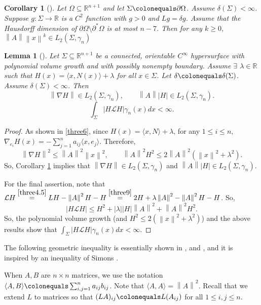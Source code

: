 \documentclass[12pt,reqno]{amsart}
\newtheorem{lemma}[theorem]{Lemma}
\newtheorem{cor}[theorem]{Corollary}
\theoremstyle{definition}
\renewcommand{\subset}{\subseteq}
\newcommand{\abs}[1]{\left|#1\right|}                   %
\newcommand{\vnormt}[1]{\left\|#1\right\|}    %
\newcommand{\R}{\mathbb{R}}
\newcommand{\redA}{\partial^{*}\Omega}
\newcommand{\sdimn}{n}
\newcommand{\adimn}{n+1}
\newcommand{\scon}{\lambda}
\newcommand{\pcon}{\delta}
\begin{document}
\begin{cor}[{\cite[Lemma 6.2]{zhu16}}]\label{cor5}
Let $\Omega\subset\R^{\adimn}$ and let $\Sigma\colonequals\partial\Omega$.  Assume $\pcon(\Sigma)<\infty$.  Suppose $g\colon\Sigma\to\R$ is a $C^{2}$ function with $g>0$ and $Lg=\pcon g$.  Assume that the Hausdorff dimension of $\partial\Omega\setminus\redA$ is at most $\sdimn-7$.  Then for any $k\geq0$, $\vnormt{A}\vnormt{x}^{k}\in L_{2}(\Sigma,\gamma_{\sdimn})$
\end{cor}

\begin{lemma}[{\cite[Theorem 9.36]{colding12a}}]\label{lemma39.1}
Let $\Sigma\subset\R^{\adimn}$ be a connected, orientable $C^{\infty}$ hypersurface with polynomial volume growth and with possibly nonempty boundary.  Assume $\exists$ $\scon\in\R$ such that $H(x)=\langle x,N(x)\rangle+\scon$ for all $x\in\Sigma$.  Let $\pcon\colonequals\pcon(\Sigma)$.   Assume $\pcon(\Sigma)<\infty$.  Then
$$\vnormt{\nabla H}\in L_{2}(\Sigma,\gamma_{\sdimn}),\qquad\vnormt{A}\abs{H}\in L_{2}(\Sigma,\gamma_{\sdimn}).$$
$$\int_{\Sigma}\abs{H\mathcal{L}H}\gamma_{\sdimn}(x)dx<\infty.$$
\end{lemma}
\begin{proof}
As shown in \eqref{three6}, since $H(x)=\langle x,N\rangle+\scon$, for any $1\leq i\leq\sdimn$, $\nabla_{e_{i}}H(x)=-\sum_{j=1}^{\sdimn}a_{ij}\langle x,e_{j}\rangle$.  Therefore,
$$\vnormt{\nabla H}^{2}\leq\vnormt{A}^{2}\vnormt{x}^{2},\qquad \vnormt{A}^{2}H^{2}\leq2\vnormt{A}^{2}(\vnormt{x}^{2}+\scon^{2}).$$
So, Corollary \ref{cor5} implies that $\vnormt{\nabla H}\in L_{2}(\Sigma,\gamma_{\sdimn})$ and $\vnormt{A}\abs{H}\in L_{2}(\Sigma,\gamma_{\sdimn})$.

For the final assertion, note that  $\mathcal{L}H\stackrel{\eqref{three4.5}}{=}LH-\vnormt{A}^{2}H-H\stackrel{\eqref{three9}}{=}2H+\scon\vnormt{A}^{2}-\vnormt{A}^{2}H-H$.  So,
$$\abs{H\mathcal{L}H}\leq H^{2}+\abs{\scon}\abs{H}\vnormt{A}^{2}+\vnormt{A}^{2}H^{2}.$$
So, the polynomial volume growth (and $H^{2}\leq 2(\vnormt{x}^{2}+\scon^{2})$) and the above results show that $\int_{\Sigma}\abs{H\mathcal{L}H}\gamma_{\sdimn}(x)dx<\infty$.
\end{proof}


The following geometric inequality is essentially shown in \cite[Lemma 10.8]{colding12a},\cite[Lemma 7.1]{zhu16} and \cite[Lemma 4.1]{cheng15}, and it is inspired by an inequality of Simons \cite{simons68}.

When $A,B$ are $\sdimn\times\sdimn$ matrices, we use the notation $\langle A,B\rangle\colonequals\sum_{i,j=1}^{\sdimn}a_{ij}b_{ij}$.  Note that $\langle A,A\rangle=\vnormt{A}^{2}$.  Recall that we extend $L$ to matrices so that $(LA)_{ij}\colonequals L(A_{ij})$ for all $1\leq i,j\leq\sdimn$.
\end{document}
